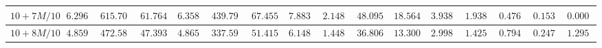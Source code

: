 \begin{table}[]
\begin{tabular}{|c|c|c|c|c|c|c|c|c|c|c|c|c|c|c|c}
$10 + 7M/10$ & $6.296600$                                                        & $615.703200$                                                      & $61.764200$                                                         & $6.358200$                                                           & $439.795700$                                                            & $67.455800$                                                       & $7.883000$                                                          & $2.148100$                                                           & $48.095000$                                                             & $18.564600$                                                       & $3.938600$                                                          & $1.938770$                                                        & $0.476940$                                                          & $0.153000$                                                           & \multicolumn{1}{c|}{$0.000930$}                                                              \\ \hline
$10 + 8M/10$ & $4.859000$                                                        & $472.587200$                                                      & $47.393000$                                                         & $4.865900$                                                           & $337.592500$                                                            & $51.415000$                                                       & $6.148700$                                                          & $1.448300$                                                           & $36.806200$                                                             & $13.300600$                                                       & $2.998400$                                                          & $1.425300$                                                        & $0.794620$                                                          & $0.247650$                                                           & \multicolumn{1}{c|}{$1.295670$}                                                              \\ \hline

\end{tabular}
\end{table}
